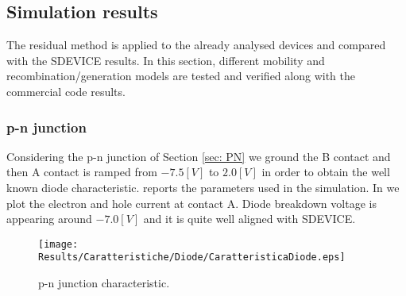 %
%
%

\subsection{Simulation results}

The residual method is applied to the already analysed devices and compared with the SDEVICE results. In this section, different mobility and recombination/generation models are tested and verified along with the commercial code results.

\subsubsection{p-n junction}

Considering the p-n junction of Section \ref{sec: PN} we ground the B contact and then A contact is ramped from $-7.5[V]$ to $2.0[V]$ in order to obtain the well known diode characteristic. 
 reports the parameters used in the simulation.
In   we plot the electron and hole current at contact A.
Diode breakdown voltage is appearing around $-7.0[V]$ and it is quite well aligned with SDEVICE.

\vspace{0.5cm}

\begin{figure}[!h]
\centering
\texttt{[image: Results/Caratteristiche/Diode/CaratteristicaDiode.eps]}
\caption{p-n junction characteristic.}
\label{fig: caratteristica diode}
\end{figure}

\vspace{0.5cm}

